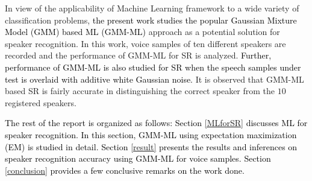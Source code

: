 \documentclass{article}
\begin{document}
{In view of the applicability of {Machine Learning} framework to a wide variety of classification problems,  \textcolor{black}{the present work studies the popular Gaussian Mixture Model (GMM) based ML (GMM-ML) \cite{2}} approach as a potential solution for speaker recognition. In this work, voice samples of ten different speakers are recorded and the performance of GMM-ML for SR is analyzed. \textcolor{black}{Further, performance of GMM-ML is also studied for SR when the speech samples under test is overlaid with additive white Gaussian noise.} It is observed that GMM-ML based SR is fairly accurate in distinguishing the correct speaker from the $10$ registered speakers. 

\textcolor{black}{The rest of the report is organized as follows: Section \ref{MLforSR} discusses ML for speaker recognition. In this section, GMM-ML using expectation maximization (EM) is studied in detail. Section \ref{result} presents the results and inferences on speaker recognition accuracy using GMM-ML for voice samples. Section \ref{conclusion} provides a few conclusive remarks on the work done.}

}
\end{document}
